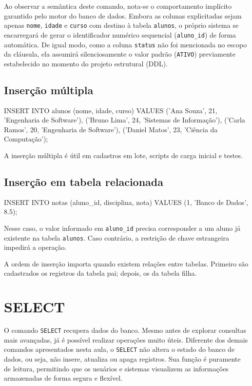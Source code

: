 Ao observar a semântica deste comando, nota-se o comportamento implícito garantido pelo motor do banco de dados. Embora as colunas explicitadas sejam apenas \texttt{nome}, \texttt{idade} e \texttt{curso} com destino à tabela \texttt{alunos}, o próprio sistema se encarregará de gerar o identificador numérico sequencial (\texttt{aluno\_id}) de forma automática. De igual modo, como a coluna \texttt{status} não foi mencionada no escopo da cláusula, ela assumirá silenciosamente o valor padrão (\texttt{ATIVO}) previamente estabelecido no momento do projeto estrutural (DDL).

\subsection{Inserção múltipla}

\begin{sqlcode}
INSERT INTO alunos (nome, idade, curso) VALUES
('Ana Souza', 21, 'Engenharia de Software'),
('Bruno Lima', 24, 'Sistemas de Informação'),
('Carla Ramos', 20, 'Engenharia de Software'),
('Daniel Matos', 23, 'Ciência da Computação');
\end{sqlcode}

A inserção múltipla é útil em cadastros em lote, scripts de carga inicial e testes.

\subsection{Inserção em tabela relacionada}

\begin{sqlcode}
INSERT INTO notas (aluno_id, disciplina, nota)
VALUES (1, 'Banco de Dados', 8.5);
\end{sqlcode}

Nesse caso, o valor informado em \texttt{aluno\_id} precisa corresponder a um aluno já existente na tabela \texttt{alunos}. Caso contrário, a restrição de chave estrangeira impedirá a operação.

\begin{observacao}
A ordem de inserção importa quando existem relações entre tabelas. Primeiro são cadastrados os registros da tabela pai; depois, os da tabela filha.
\end{observacao}

\section{SELECT}

O comando \texttt{SELECT} recupera dados do banco. Mesmo antes de explorar consultas mais avançadas, já é possível realizar operações muito úteis. Diferente dos demais comandos apresentados nesta aula, o \texttt{SELECT} não altera o estado do banco de dados, ou seja, não insere, atualiza ou apaga registros. Sua função é puramente de leitura, permitindo que os usuários e sistemas visualizem as informações armazenadas de forma segura e flexível.

